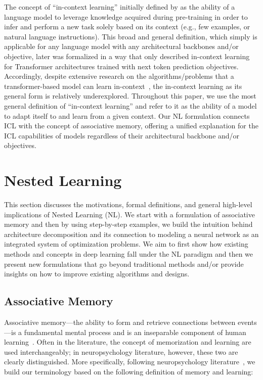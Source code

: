 \documentclass{article}
\newcommand{\citep}{\parencite}
\newcommand{\citet}{\textcite}
\newcommand{\head}[1]{\vspace{1.7mm}\noindent{{\textcolor{c4}{\bf #1.}}}}
\begin{document}
\head{In-context Learning}
The concept of ``in-context learning'' initially defined by \citet{brown2020language} as the ability of a language model to leverage knowledge acquired during pre-training in order to infer and perform a new task solely based on its context (e.g., few examples, or natural language instructions). This broad and general definition, which simply is applicable for any language model with any architectural backbones and/or objective, later was formalized in a way that only described in-context learning for Transformer architectures trained with next token prediction objectives. Accordingly, despite extensive research on the algorithms/problems that a transformer-based model can learn in-context~\citep{akyurek2022learning, akyurek2024context, dherin2025learning, zhang2024trained}, the in-context learning as its general form is relatively underexplored. Throughout this paper, we use the most general definition of ``in-context learning'' and refer to it as the ability of a model to adapt itself to and learn from a given context. Our NL formulation connects ICL with the concept of associative memory, offering a unified explanation for the ICL capabilities of models regardless of their architectural backbone and/or objectives. 

 

\section{Nested Learning}\label{sec:nested-learning}
This section discusses the motivations, formal definitions, and general high-level implications of Nested Learning (NL). We start with a formulation of associative memory and then by using step-by-step examples, we build the intuition behind architecture decomposition and its connection to modeling a neural network as an integrated system of optimization problems. We aim to first show how existing methods and concepts in deep learning fall under the NL paradigm and then we present new formulations that go beyond traditional methods and/or provide insights on how to improve existing algorithms and designs. 

\subsection{Associative Memory}\label{sec:associaitve-memory}
Associative memory—the ability to form and retrieve connections between events—is a fundamental mental process and is an inseparable component of human learning~\citep{terry2017learning}. Often in the literature, the concept of memorization and learning are used interchangeably; in neuropsychology literature, however, these two are clearly distinguished. More specifically, following neuropsychology literature~\citep{okano2000learning}, we build our terminology based on the following definition of memory and learning: 
\end{document}
